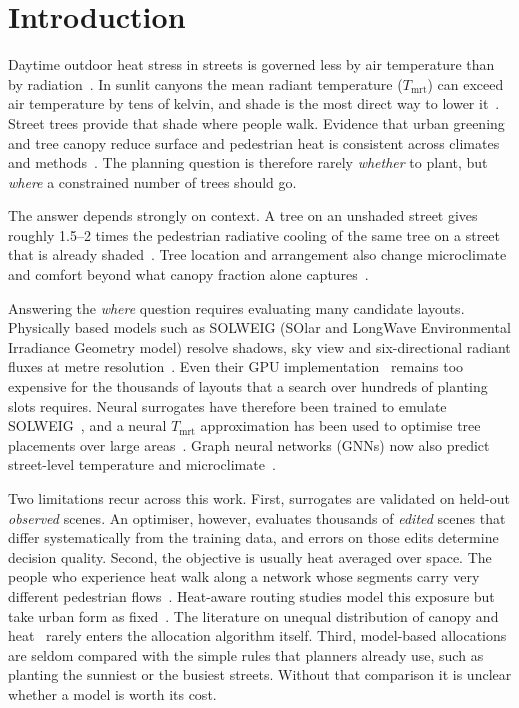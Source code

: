 \documentclass[preprint,12pt,authoryear]{elsarticle}
\newcommand{\tmrt}{\ensuremath{T_\mathrm{mrt}}}
\begin{document}
\section{Introduction}\label{sec:intro}

Daytime outdoor heat stress in streets is governed less by air temperature than by radiation~\citep{thorsson2007,lindberg2008}. In sunlit canyons the mean radiant temperature (\tmrt) can exceed air temperature by tens of kelvin, and shade is the most direct way to lower it~\citep{middel2021}. Street trees provide that shade where people walk. Evidence that urban greening and tree canopy reduce surface and pedestrian heat is consistent across climates and methods~\citep{bowler2010,rahman2020,schwaab2021,lee2016}. The planning question is therefore rarely \emph{whether} to plant, but \emph{where} a constrained number of trees should go.

The answer depends strongly on context. A tree on an unshaded street gives roughly 1.5--2 times the pedestrian radiative cooling of the same tree on a street that is already shaded~\citep{lachapelle2023}. Tree location and arrangement also change microclimate and comfort beyond what canopy fraction alone captures~\citep{zhao2018,ziter2019}.

Answering the \emph{where} question requires evaluating many candidate layouts. Physically based models such as SOLWEIG (SOlar and LongWave Environmental Irradiance Geometry model) resolve shadows, sky view and six-directional radiant fluxes at metre resolution~\citep{lindberg2008,lindberg2011,lindberg2018}. Even their GPU implementation~\citep{kamath2026} remains too expensive for the thousands of layouts that a search over hundreds of planting slots requires. Neural surrogates have therefore been trained to emulate SOLWEIG~\citep{briegel2023,briegel2024}, and a neural \tmrt{} approximation has been used to optimise tree placements over large areas~\citep{schrodi2023}. Graph neural networks (GNNs) now also predict street-level temperature and microclimate~\citep{yu2024,xin2025}.

Two limitations recur across this work. First, surrogates are validated on held-out \emph{observed} scenes. An optimiser, however, evaluates thousands of \emph{edited} scenes that differ systematically from the training data, and errors on those edits determine decision quality. Second, the objective is usually heat averaged over space. The people who experience heat walk along a network whose segments carry very different pedestrian flows~\citep{sevtsuk2021,kuras2017}. Heat-aware routing studies model this exposure but take urban form as fixed~\citep{kolaxidis2025,vu2025}. The literature on unequal distribution of canopy and heat~\citep{schwarz2015,hsu2021,mcdonald2021,locke2021,benz2021} rarely enters the allocation algorithm itself. Third, model-based allocations are seldom compared with the simple rules that planners already use, such as planting the sunniest or the busiest streets. Without that comparison it is unclear whether a model is worth its cost.
\end{document}
